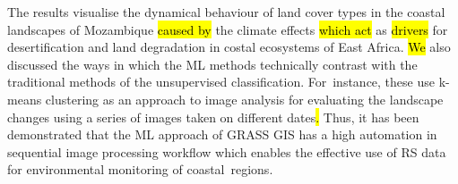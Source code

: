 \documentclass[coasts,article,accept,pdftex,oneauthor]{Definitions/mdpi}
\begin{document}
The\hl{ }results {visualise} the {dynamical }behaviour of land cover types in the coastal landscapes of Mozambique\hl{ caused by} the climate effects \hl{which act} as \hl{drivers} for desertification and land degradation in\hl{ }costal ecosystems {of East Africa}. \hl{We} also discussed the ways in which the ML methods {technically }contrast with {the }traditional methods of {the }unsupervised classification{. For~instance, these use} k-means clustering {as an approach} to image analysis{ }for evaluating the landscape changes using a series of images taken on different dates\hl{. }Thus, {it has been demonstrated that }the ML approach of GRASS GIS{ has a }high automation in sequential image processing workflow which enables {the }effective use of RS data for environmental monitoring of coastal~regions.






\end{document}

